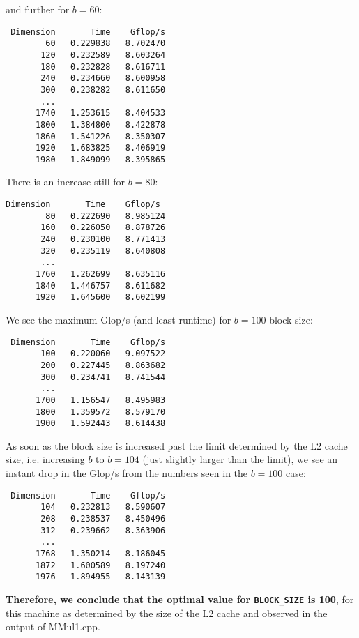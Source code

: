 \documentclass[10pt, letterpaper]{article}
\begin{document}
and further for $b=60$:
\begin{verbatim}
 Dimension       Time    Gflop/s     
        60   0.229838   8.702470  
       120   0.232589   8.603264
       180   0.232828   8.616711 
       240   0.234660   8.600958 
       300   0.238282   8.611650
       ...
      1740   1.253615   8.404533 
      1800   1.384800   8.422878 
      1860   1.541226   8.350307 
      1920   1.683825   8.406919 
      1980   1.849099   8.395865 
\end{verbatim} 
There is an increase still for $b=80$:
\begin{verbatim}
Dimension       Time    Gflop/s    
        80   0.222690   8.985124 
       160   0.226050   8.878726 
       240   0.230100   8.771413 
       320   0.235119   8.640808  
       ...
      1760   1.262699   8.635116  
      1840   1.446757   8.611682  
      1920   1.645600   8.602199 
\end{verbatim}
We see the maximum Glop/s (and least runtime) for $b=100$ block size:
\begin{verbatim}
 Dimension       Time    Gflop/s  
       100   0.220060   9.097522 
       200   0.227445   8.863682 
       300   0.234741   8.741544 
       ...
      1700   1.156547   8.495983 
      1800   1.359572   8.579170 
      1900   1.592443   8.614438 
\end{verbatim}
As soon as the block size is increased past the limit determined by the L2 cache size, i.e. increasing $b$ to $b=104$ (just slightly larger than the limit), we see an instant drop in the Glop/s from the numbers seen in the $b=100$ case:
\begin{verbatim}
 Dimension       Time    Gflop/s  
       104   0.232813   8.590607  
       208   0.238537   8.450496
       312   0.239662   8.363906  
       ...
      1768   1.350214   8.186045 
      1872   1.600589   8.197240 
      1976   1.894955   8.143139 
\end{verbatim}
\textbf{Therefore, we conclude that the optimal value for {\tt BLOCK\_SIZE} is {100}}, for this machine as determined by the size of the L2 cache and observed in the output of MMul1.cpp.
\end{document}

